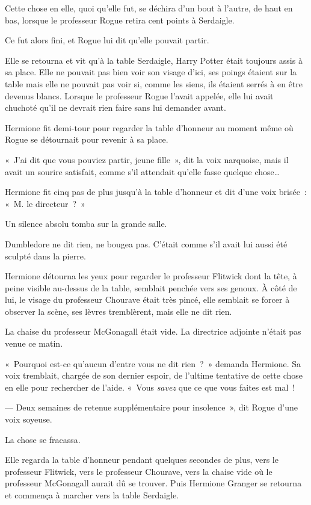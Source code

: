 Cette chose en elle, quoi qu'elle fut, se déchira d'un bout à l'autre, de haut en bas, lorsque le professeur Rogue retira cent points à Serdaigle.

Ce fut alors fini, et Rogue lui dit qu'elle pouvait partir.

Elle se retourna et vit qu'à la table Serdaigle, Harry Potter était toujours assis à sa place.
Elle ne pouvait pas bien voir son visage d'ici, ses poings étaient sur la table mais elle ne pouvait pas voir si, comme les siens, ils étaient serrés à en être devenus blancs.
Lorsque le professeur Rogue l'avait appelée, elle lui avait chuchoté qu'il ne devrait rien faire sans lui demander avant.

Hermione fit demi-tour pour regarder la table d'honneur au moment même où Rogue se détournait pour revenir à sa place.

«~J'ai dit que vous pouviez partir, jeune fille~», dit la voix narquoise, mais il avait un sourire satisfait, comme s'il attendait qu'elle fasse quelque chose…

Hermione fit cinq pas de plus jusqu'à la table d'honneur et dit d'une voix brisée~: «~M. le directeur~?~»

Un silence absolu tomba sur la grande salle.

Dumbledore ne dit rien, ne bougea pas.
C'était comme s'il avait lui aussi été sculpté dans la pierre.

Hermione détourna les yeux pour regarder le professeur Flitwick dont la tête, à peine visible au-dessus de la table, semblait penchée vers ses genoux.
À côté de lui, le visage du professeur Chourave était très pincé, elle semblait se forcer à observer la scène, ses lèvres tremblèrent, mais elle ne dit rien.

La chaise du professeur McGonagall était vide.
La directrice adjointe n'était pas venue ce matin.

«~Pourquoi est-ce qu'aucun d'entre vous ne dit rien~?~»
demanda Hermione.
Sa voix tremblait, chargée de son dernier espoir, de l'ultime tentative de cette chose en elle pour rechercher de l'aide.
«~Vous \emph{savez} que ce que vous faites est mal~!

--- Deux semaines de retenue supplémentaire pour insolence~», dit Rogue d'une voix soyeuse.

La chose se fracassa.

Elle regarda la table d'honneur pendant quelques secondes de plus, vers le professeur Flitwick, vers le professeur Chourave, vers la chaise vide où le professeur McGonagall aurait dû se trouver.
Puis Hermione Granger se retourna et commença à marcher vers la table Serdaigle.

